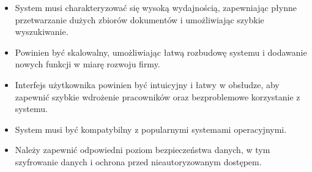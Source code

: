 \begin{itemize}
    \item System musi charakteryzować się wysoką wydajnością, zapewniając płynne przetwarzanie dużych zbiorów dokumentów i umożliwiając szybkie wyszukiwanie.
    \item Powinien być skalowalny, umożliwiając łatwą rozbudowę systemu i dodawanie nowych funkcji w miarę rozwoju firmy.
    \item Interfejs użytkownika powinien być intuicyjny i łatwy w obsłudze, aby zapewnić szybkie wdrożenie pracowników oraz bezproblemowe korzystanie z systemu.
    \item System musi być kompatybilny z popularnymi systemami operacyjnymi.
    \item Należy zapewnić odpowiedni poziom bezpieczeństwa danych, w tym szyfrowanie danych i ochrona przed nieautoryzowanym dostępem.
\end{itemize}

